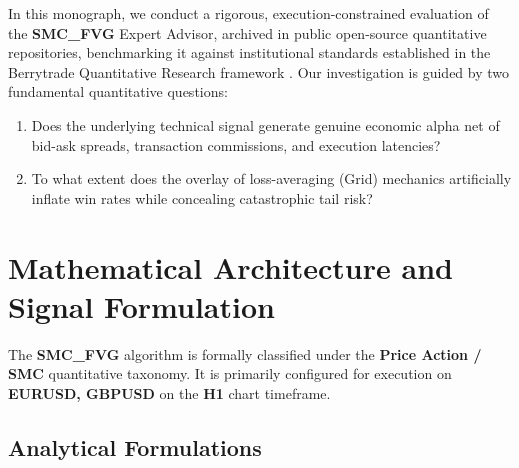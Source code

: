 \documentclass[11pt,a4paper]{article}
\begin{document}
In this monograph, we conduct a rigorous, execution-constrained evaluation of the \textbf{SMC\_FVG} Expert Advisor, archived in public open-source quantitative repositories, benchmarking it against institutional standards established in the Berrytrade Quantitative Research framework \cite{artsu2026illusion}. Our investigation is guided by two fundamental quantitative questions:
\begin{enumerate}
    \item Does the underlying technical signal generate genuine economic alpha net of bid-ask spreads, transaction commissions, and execution latencies?
    \item To what extent does the overlay of loss-averaging (Grid) mechanics artificially inflate win rates while concealing catastrophic tail risk?
\end{enumerate}

\section{Mathematical Architecture and Signal Formulation}
The \textbf{SMC\_FVG} algorithm is formally classified under the \textbf{Price Action / SMC} quantitative taxonomy. It is primarily configured for execution on \textbf{EURUSD, GBPUSD} on the \textbf{H1} chart timeframe.

\subsection{Analytical Formulations}
\end{document}
